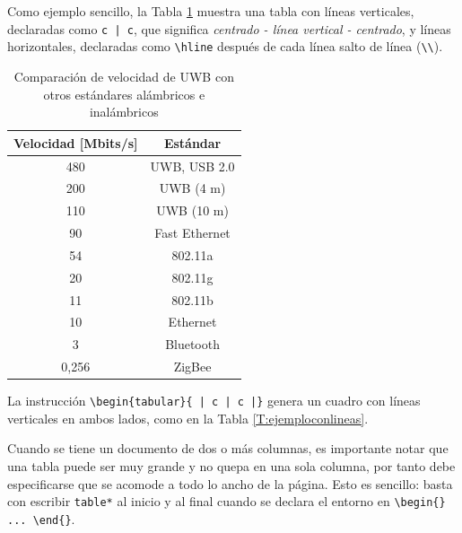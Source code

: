 Como ejemplo sencillo, la Tabla \ref{T:ejemplo} muestra una tabla con líneas verticales, declaradas como \verb+c | c+, que significa \textit{centrado - línea vertical - centrado}, y líneas horizontales, declaradas como \verb+\hline+ después de cada línea salto de línea (\verb+\\+).

\begin{table}
\caption{Comparación de velocidad de UWB con otros estándares alámbricos e inalámbricos}
\label{T:ejemplo}
\begin{center}
\begin{tabular}{ c | c}
\hline
\textbf{Velocidad [Mbits/s]} & \textbf{Estándar} \\ 
\hline
480 & UWB, USB 2.0 \\ 
200 & UWB (4 m) \\
110 & UWB (10 m) \\ 
90 & Fast Ethernet \\ 
54 & 802.11a \\ 
20 & 802.11g \\ 
11 & 802.11b \\ 
10 & Ethernet \\ 
3 & Bluetooth \\ 
0,256 & ZigBee \\ 
\hline
\end{tabular}
\end{center}
\end{table}

La instrucción \verb+\begin{tabular}{ | c | c |}+ genera un cuadro con líneas verticales en ambos lados, como en la Tabla \ref{T:ejemploconlineas}. 

Cuando se tiene un documento de dos o más columnas, es importante notar que una tabla puede ser muy grande y no quepa en una sola columna, por tanto debe especificarse que se acomode a todo lo ancho de la página. Esto es sencillo: basta con escribir \verb+table*+ al inicio y al final cuando se declara el entorno en \verb+\begin{} ... \end{}+.

